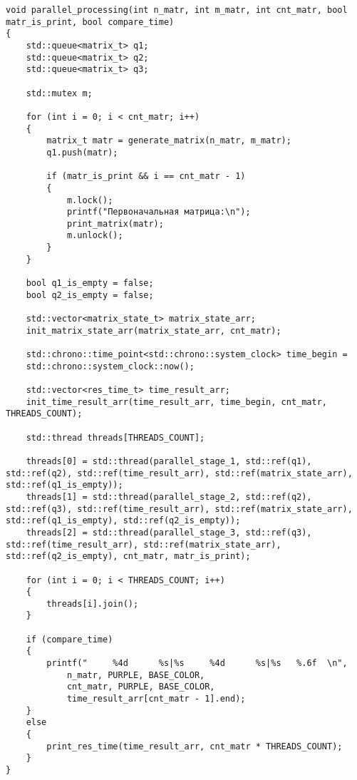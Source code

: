 \begin{center}
\captionsetup{justification=raggedright,singlelinecheck=off}
\begin{lstlisting}[label=lst:parallel_processing,caption=Функция алгоритма конвейерной обработки матрицы]
void parallel_processing(int n_matr, int m_matr, int cnt_matr, bool matr_is_print, bool compare_time)
{
	std::queue<matrix_t> q1;
	std::queue<matrix_t> q2;
	std::queue<matrix_t> q3;

	std::mutex m;

	for (int i = 0; i < cnt_matr; i++)
	{
		matrix_t matr = generate_matrix(n_matr, m_matr);
		q1.push(matr);

		if (matr_is_print && i == cnt_matr - 1)
		{
			m.lock();
			printf("Первоначальная матрица:\n");
			print_matrix(matr);
			m.unlock();
		}
	}
	
	bool q1_is_empty = false;
	bool q2_is_empty = false;

	std::vector<matrix_state_t> matrix_state_arr;
	init_matrix_state_arr(matrix_state_arr, cnt_matr);

	std::chrono::time_point<std::chrono::system_clock> time_begin = 
	std::chrono::system_clock::now();

	std::vector<res_time_t> time_result_arr;
	init_time_result_arr(time_result_arr, time_begin, cnt_matr, THREADS_COUNT);

	std::thread threads[THREADS_COUNT];

	threads[0] = std::thread(parallel_stage_1, std::ref(q1), std::ref(q2), std::ref(time_result_arr), std::ref(matrix_state_arr), std::ref(q1_is_empty));
	threads[1] = std::thread(parallel_stage_2, std::ref(q2), std::ref(q3), std::ref(time_result_arr), std::ref(matrix_state_arr), std::ref(q1_is_empty), std::ref(q2_is_empty));
	threads[2] = std::thread(parallel_stage_3, std::ref(q3), std::ref(time_result_arr), std::ref(matrix_state_arr), std::ref(q2_is_empty), cnt_matr, matr_is_print);

	for (int i = 0; i < THREADS_COUNT; i++)
	{
		threads[i].join();
	}

	if (compare_time)
	{
		printf("     %4d      %s|%s     %4d      %s|%s   %.6f  \n",
			n_matr, PURPLE, BASE_COLOR, 
			cnt_matr, PURPLE, BASE_COLOR,
			time_result_arr[cnt_matr - 1].end);
	}
	else
	{
		print_res_time(time_result_arr, cnt_matr * THREADS_COUNT);
	}
}
\end{lstlisting}
\end{center}

\clearpage

